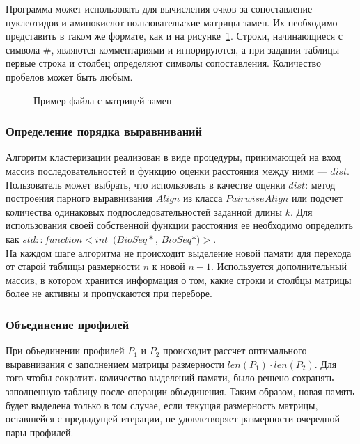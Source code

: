 Программа может использовать для вычисления очков за сопоставление нуклеотидов и аминокислот пользовательские матрицы замен. Их необходимо представить в таком же формате, как и на рисунке~\ref{ris:BLOSUM62}.
Строки, начинающиеся с символа $\#$, являются комментариями и игнорируются, а при задании таблицы первые строка и столбец определяют символы сопоставления. Количество пробелов может быть любым.

\begin{figure}[h]
	\caption{Пример файла с матрицей замен}
	\label{ris:BLOSUM62}
\end{figure}

\subsubsection[Определение порядка выравниваний]{\large Определение порядка выравниваний}
\hspace{\parindent} Алгоритм кластеризации реализован в виде процедуры, принимающей на вход массив последовательностей и функцию оценки расстояния между ними --- $dist$. Пользователь может выбрать, что использовать в качестве оценки $dist$: метод построения парного выравнивания $Align$ из класса $PairwiseAlign$ или подсчет количества одинаковых подпоследовательностей заданной длины $k$. Для использования своей собственной функции расстояния ее необходимо определить как $std::function<int$~$(BioSeq*$, $BioSeq*)>$. \\
\indent На каждом шаге алгоритма не происходит выделение новой памяти для перехода от старой таблицы размерности $n$ к новой $n-1$. Используется дополнительный массив, в котором хранится информация о том, какие строки и столбцы матрицы более не активны и пропускаются при переборе. 

\subsubsection[Объединение профилей]{\large Объединение профилей}
\hspace{\parindent} При объединении профилей $P_1$ и $P_2$ происходит рассчет оптимального выравнивания с заполнением матрицы размерности $len(P_1) \cdot len(P_2)$. Для того чтобы сократить количество выделений памяти, было решено сохранять заполненную таблицу после операции объединения. Таким образом, новая память будет выделена только в том случае, если текущая размерность матрицы, оставшейся с предыдущей итерации, не удовлетворяет размерности очередной пары профилей.

